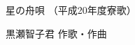\documentclass[10pt,b5j]{tarticle} %
\begin{document}
\begin{minipage}[c]{0.7\hsize} %
    \begin{center}
        {\LARGE
            星の舟唄 %
        }
        {\small 
            （平成20年度寮歌） %
        }
    \end{center}
\end{minipage}
\begin{minipage}[c]{0.3\hsize} %
    \begin{flushright} %
        黒瀬智子君 作歌・作曲 %
    \end{flushright}
\end{minipage}
\end{document}
